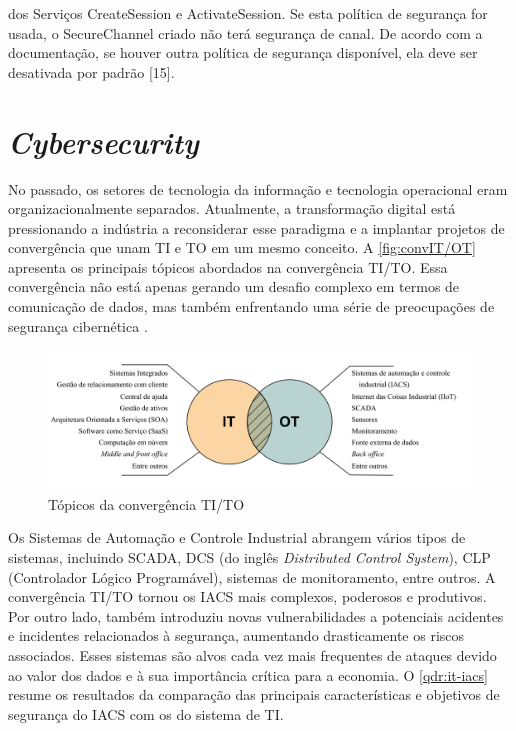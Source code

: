 dos Serviços CreateSession e ActivateSession. Se esta política de segurança for usada, o SecureChannel criado não terá segurança de canal. De acordo com a documentação, se houver outra política de segurança disponível, ela deve ser desativada por padrão [15].
        
\section{\textit{Cybersecurity}} \label{sec:cybersecurity}

    No passado, os setores de tecnologia da informação e tecnologia operacional eram organizacionalmente separados. Atualmente, a transformação digital está pressionando a indústria a reconsiderar esse paradigma e a implantar projetos de convergência que unam TI e TO em um mesmo conceito. A \autoref{fig:convIT/OT} apresenta os principais tópicos abordados na convergência TI/TO. Essa convergência não está apenas gerando um desafio complexo em termos de comunicação de dados, mas também enfrentando uma série de preocupações de segurança cibernética \cite{wiboonrat2022}.

    \begin{figure}[htbp]
        \caption{\label{fig:convIT/OT}Tópicos da convergência TI/TO}
        \begin{center}
            \includegraphics[width=1\textwidth]{USPSC-img/convergenceITOT.png}
        \end{center}
    \end{figure}

    Os Sistemas de Automação e Controle Industrial abrangem vários tipos de sistemas, incluindo SCADA, DCS (do inglês \textit{Distributed Control System}), CLP (Controlador Lógico Programável), sistemas de monitoramento, entre outros. A convergência TI/TO tornou os IACS mais complexos, poderosos e produtivos. Por outro lado, também introduziu novas vulnerabilidades a potenciais acidentes e incidentes relacionados à segurança, aumentando drasticamente os riscos associados. Esses sistemas são alvos cada vez mais frequentes de ataques devido ao valor dos dados e à sua importância crítica para a economia. O \autoref{qdr:it-iacs} resume os resultados da comparação das principais características e objetivos de segurança do IACS com os do sistema de TI.

